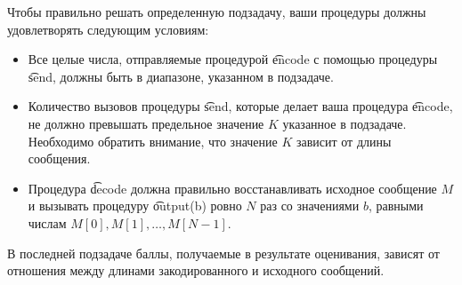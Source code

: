 Чтобы правильно решать определенную подзадачу, ваши процедуры должны удовлетворять
следующим условиям:
\begin{itemize}
\item Все целые числа, отправляемые процедурой \t{encode} с помощью процедуры \t{send},
должны быть в диапазоне, указанном в подзадаче.
\item Количество вызовов процедуры \t{send}, которые делает ваша процедура \t{encode}, не
должно превышать предельное значение $K$ указанное в подзадаче. Необходимо
обратить внимание, что значение $K$ зависит от длины сообщения.
\item Процедура \t{decode} должна правильно восстанавливать исходное сообщение $M$ и
вызывать процедуру \t{output(b)} ровно $N$ раз со значениями $b$, равными числам $M[0], M[1], \dots, M[N-1]$.
\end{itemize}
В последней подзадаче баллы, получаемые в результате оценивания, зависят от отношения
между длинами закодированного и исходного сообщений.